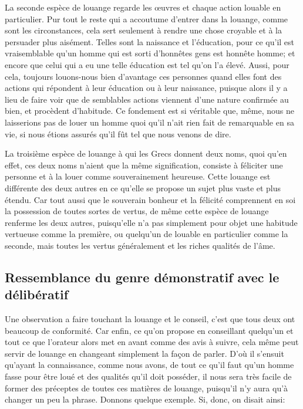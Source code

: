 La seconde espèce de louange regarde les œuvres et chaque action louable en particulier. Pur tout le reste qui a
accoutume d'entrer dans la louange, comme sont les circonstances, cela sert seulement à rendre une chose croyable
et à la persuader plus aisément. Telles sont la naissance et l'éducation, pour ce qu'il est vraisemblable qu'un
homme qui est sorti d'honnêtes gens est honnête homme; et encore que celui qui a eu une telle éducation est tel
qu'on l'a élevé. Aussi, pour cela, toujours louons-nous bien d'avantage ces personnes quand elles font des actions
qui répondent à leur éducation ou à leur naissance, puisque alors il y a lieu de faire voir que de semblables
actions viennent d'une nature confirmée au bien, et procèdent d'habitude. Ce fondement est si véritable que, même,
nous ne laisserions pas de louer un homme quoi qu'il n'ait rien fait de remarquable en sa vie, si nous étions
assurés qu'il fût tel que nous venons de dire.

\bigbreak

La troisième espèce de louange à qui les Grecs donnent deux noms, quoi qu'en effet, ces deux noms n'aient que la
même signification, consiste à féliciter une personne et à la louer comme souverainement heureuse. Cette louange
est différente des deux autres en ce qu'elle se propose un sujet plus vaste et plus étendu. Car tout aussi que le
souverain bonheur et la félicité comprennent en soi la possession de toutes sortes de vertus, de même cette espèce
de louange renferme les deux autres, puisqu'elle n'a pas simplement pour objet une habitude vertueuse comme la
première, ou quelqu'un de louable en particulier comme la seconde, mais toutes les vertus généralement et les
riches qualités de l'âme.

\subsection{Ressemblance du genre démonstratif avec le délibératif}

Une observation a faire touchant la louange et le conseil, c'est que tous deux ont beaucoup de conformité. Car
enfin, ce qu'on propose en conseillant quelqu'un et tout ce que l'orateur alors met en avant comme des avis à
suivre, cela même peut servir de louange en changeant simplement la façon de parler. D'où il s'ensuit qu'ayant
la connaissance, comme nous avons, de tout ce qu'il faut qu'un homme fasse pour être loué et des qualités qu'il
doit posséder, il nous sera très facile de former des préceptes de toutes ces matières de louange, puisqu'il n'y
aura qu'à changer un peu la phrase. Donnons quelque exemple. Si, donc, on disait ainsi:

